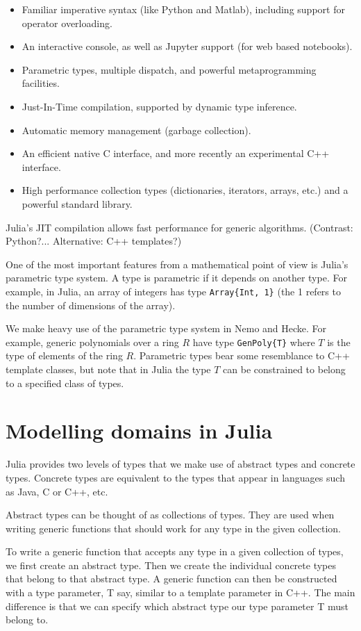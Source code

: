 \documentclass{sig-alternate-05-2015}
\begin{document}
\begin{itemize}
\item Familiar imperative syntax (like Python and Matlab), including support for operator overloading.
\item An interactive console, as well as Jupyter support (for web based notebooks).
\item Parametric types, multiple dispatch, and powerful metaprogramming facilities.
\item Just-In-Time compilation, supported by dynamic type inference.
\item Automatic memory management (garbage collection).
\item An efficient native C interface, and more recently an experimental C++ interface.
\item High performance collection types (dictionaries, iterators, arrays, etc.) and a powerful standard library.
\end{itemize}

Julia's JIT compilation allows fast performance for
generic algorithms. (Contrast: Python?... Alternative: C++ templates?)

One of the most important features from a mathematical point of view is Julia's parametric type system.
A type is parametric if it depends on another type. For example, in Julia, an array of integers has
type \texttt{Array\{Int, 1\}} (the 1 refers to the number of dimensions of the array).

We make heavy use of the parametric type system in Nemo and Hecke. For example, generic polynomials
over a ring $R$ have type \texttt{GenPoly\{T\}} where $T$ is the type of elements of the ring $R$.
Parametric types bear some resemblance to C++ template classes, but note that in Julia the type $T$ can
be constrained to belong to a specified class of types.

\section{Modelling domains in Julia}

Julia provides two levels of types that we make use of abstract types and concrete types.
Concrete types are equivalent to the types that appear in languages such as Java, C or C++,
etc.

Abstract types can be thought of as collections of types. They are used when writing generic
functions that should work for any type in the given collection.

To write a generic function that accepts any type in a given collection of types, we first
create an abstract type. Then we create the individual concrete types that belong to that
abstract type. A generic function can then be constructed with a type parameter, T
say, similar to a template parameter in C++. The main difference is that we can specify
which abstract type our type parameter T must belong to.
\end{document}
